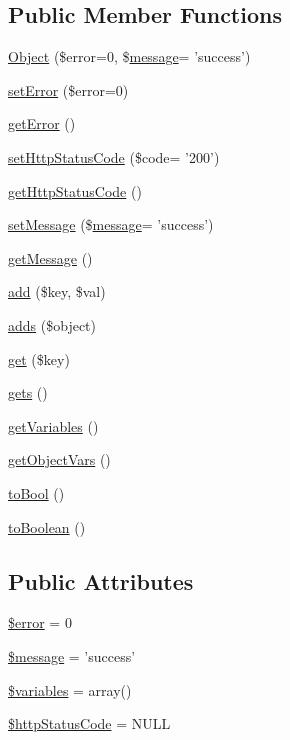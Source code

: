 \subsection*{Public Member Functions}
\begin{DoxyCompactItemize}
\item 
\hyperlink{classObject_a9c1f4bf33208a5c858c0722afce90f30}{Object} (\$error=0, \$\hyperlink{classmessage}{message}= 'success')
\item 
\hyperlink{classObject_a12f7ac70214558a1774ca010865c798e}{set\+Error} (\$error=0)
\item 
\hyperlink{classObject_a2aaced460a018edd69bf17813d6c48df}{get\+Error} ()
\item 
\hyperlink{classObject_a56a37e14694356404f793dd0ab02e2af}{set\+Http\+Status\+Code} (\$code= '200')
\item 
\hyperlink{classObject_a5cb4abc24dd01e04c24da487d476efc0}{get\+Http\+Status\+Code} ()
\item 
\hyperlink{classObject_aef83a6fcde9ce261446fe4849a33bb10}{set\+Message} (\$\hyperlink{classmessage}{message}= 'success')
\item 
\hyperlink{classObject_a813487b153bfe18102ac76d8c718999f}{get\+Message} ()
\item 
\hyperlink{classObject_a4f8a7fa8794663b7625fc15c9589797b}{add} (\$key, \$val)
\item 
\hyperlink{classObject_a6dbae38facc1000561b8b230847aaca1}{adds} (\$object)
\item 
\hyperlink{classObject_ae6dff49b7ab68822bdb4ce6940c10d3f}{get} (\$key)
\item 
\hyperlink{classObject_ad6f51071a4048c1fed581748065e4d68}{gets} ()
\item 
\hyperlink{classObject_ad33c509ec041fb43c6e25f8155577925}{get\+Variables} ()
\item 
\hyperlink{classObject_afe1fe6fc005389cd616a5e9105de977a}{get\+Object\+Vars} ()
\item 
\hyperlink{classObject_a409216fd5ab386b1e78e311440113f75}{to\+Bool} ()
\item 
\hyperlink{classObject_afafb45098e163c179940c7e1ddc67fe2}{to\+Boolean} ()
\end{DoxyCompactItemize}
\subsection*{Public Attributes}
\begin{DoxyCompactItemize}
\item 
\hyperlink{classObject_a891a586df36cca119a56bb509f582858}{\$error} = 0
\item 
\hyperlink{classObject_af661550c62873d6b6e61f32d68c56973}{\$message} = 'success'
\item 
\hyperlink{classObject_a153e76f6619408780cc2b50cef5100c6}{\$variables} = array()
\item 
\hyperlink{classObject_a82ad6bb41d770d91d9d10a97495669d0}{\$http\+Status\+Code} = N\+U\+L\+L
\end{DoxyCompactItemize}


